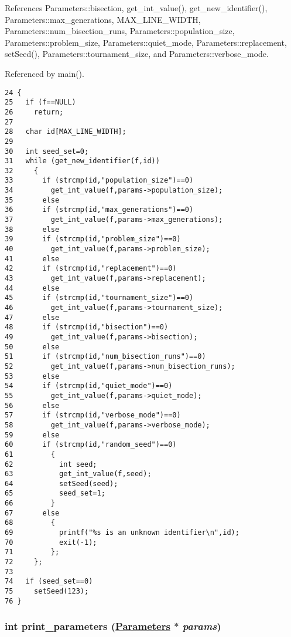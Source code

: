 References Parameters::bisection, get\_\-int\_\-value(), get\_\-new\_\-identifier(), Parameters::max\_\-generations, MAX\_\-LINE\_\-WIDTH, Parameters::num\_\-bisection\_\-runs, Parameters::population\_\-size, Parameters::problem\_\-size, Parameters::quiet\_\-mode, Parameters::replacement, set\-Seed(), Parameters::tournament\_\-size, and Parameters::verbose\_\-mode.

Referenced by main().

\begin{Code}\begin{verbatim}24 {
25   if (f==NULL)
26     return;
27 
28   char id[MAX_LINE_WIDTH];
29 
30   int seed_set=0;
31   while (get_new_identifier(f,id))
32     {
33       if (strcmp(id,"population_size")==0)
34         get_int_value(f,params->population_size);
35       else
36       if (strcmp(id,"max_generations")==0)
37         get_int_value(f,params->max_generations);
38       else
39       if (strcmp(id,"problem_size")==0)
40         get_int_value(f,params->problem_size);
41       else
42       if (strcmp(id,"replacement")==0)
43         get_int_value(f,params->replacement);
44       else
45       if (strcmp(id,"tournament_size")==0)
46         get_int_value(f,params->tournament_size);
47       else
48       if (strcmp(id,"bisection")==0)
49         get_int_value(f,params->bisection);
50       else
51       if (strcmp(id,"num_bisection_runs")==0)
52         get_int_value(f,params->num_bisection_runs);
53       else
54       if (strcmp(id,"quiet_mode")==0)
55         get_int_value(f,params->quiet_mode);
56       else
57       if (strcmp(id,"verbose_mode")==0)
58         get_int_value(f,params->verbose_mode);
59       else
60       if (strcmp(id,"random_seed")==0)
61         {
62           int seed;
63           get_int_value(f,seed);
64           setSeed(seed);
65           seed_set=1;
66         }
67       else
68         {
69           printf("%s is an unknown identifier\n",id);
70           exit(-1);
71         };
72     };
73   
74   if (seed_set==0)
75     setSeed(123);
76 }
\end{verbatim}\end{Code}


\hypertarget{parse-input_8hpp_9d6eb3d840afb4c96f4d0e52e61c3bf7}{
\subsubsection[print\_\-parameters]{\setlength{\rightskip}{0pt plus 5cm}int print\_\-parameters (\hyperlink{struct_parameters}{Parameters} $\ast$ {\em params})}}
\label{parse-input_8hpp_9d6eb3d840afb4c96f4d0e52e61c3bf7}


